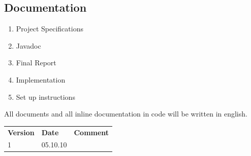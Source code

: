 \documentclass[a4paper,10pt,titlepage]{article}
\begin{document}
\subsection{Documentation}
\begin{enumerate}
 \item Project Specifications
 \item Javadoc
 \item Final Report
 \item Implementation
 \item Set up instructions
\end{enumerate}

All documents and all inline documentation in code will be written in english.


\newpage
\begin{tabularx}{\textwidth}{XXX}
\textbf{Version} & \textbf{Date} & \textbf{Comment}\\
1 & 05.10.10 & \\
\end{tabularx}
\end{document}
